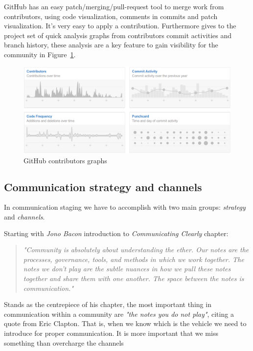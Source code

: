 \documentclass[11pt]{scrartcl}
\begin{document}
\par GitHub has an easy patch/merging/pull-request tool to merge work from contributors, using code visualization, comments in commits and patch visualization. It's very easy to apply a contribution. Furthermore gives to the project set of quick analysis graphs from contributors commit activities and branch history, these analysis are a key feature to gain visibility for the community in Figure~\ref{github-graphs}.

\begin{figure}[H]
\centering
\includegraphics[width=1\textwidth]{github-graphs.png}
\caption{GitHub contributors graphs}
\label{github-graphs}
\end{figure}


\subsection{Communication strategy and channels}
\label{sub:communication-strategy}

\par In communication staging we have to accomplish with two main groups: \emph{strategy} and \emph{channels}.

\par Starting with \emph{Jono Bacon}\cite{art-of-community} introduction to \emph{Communicating Clearly} chapter:
\begin{quotation}
    \emph{"Community is absolutely about understanding the ether. Our notes are the processes, governance, tools, and methods in which we work together. The notes we don’t play are the subtle nuances in how we pull these notes together and share them with one another. The space between the notes is communication."}
\end{quotation}

\par Stands as the centrepiece of his chapter, the most important thing in communication within a community are \emph{"the notes you do not play"}, citing a quote from Eric Clapton. That is, when we know which is the vehicle we need to introduce for proper communication. It is more important that we miss something than overcharge the channels
\end{document}
